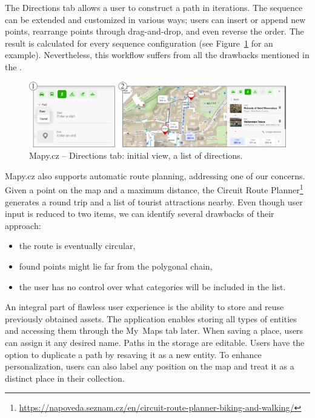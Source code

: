 The Directions tab allows a user to construct a path in iterations. The sequence can be extended and customized in various ways; users can insert or append new points, rearrange points through drag-and-drop, and even reverse the order. The result is calculated for every sequence configuration (see Figure~\ref{fig:analysis-mapy-cz-directions} for an example). Nevertheless, this workflow suffers from all the drawbacks mentioned in the \emph{}.

\begin{figure}[!h]
\centering
\includegraphics[width=\linewidth]{img/analysis/mapy-cz-directions.png}
\caption{Mapy.cz -- Directions tab:  initial view,  a list of directions.}
\label{fig:analysis-mapy-cz-directions}
\end{figure}

Mapy.cz also supports automatic route planning, addressing one of our concerns. Given a point on the map and a maximum distance, the Circuit Route Planner\footnote{\href{https://napoveda.seznam.cz/en/circuit-route-planner-biking-and-walking/}{https://napoveda.seznam.cz/en/circuit-route-planner-biking-and-walking/}} generates a round trip and a list of tourist attractions nearby. Even though user input is reduced to two items, we can identify several drawbacks of their approach:
\begin{itemize}
\item the route is eventually circular,
\item found points might lie far from the polygonal chain,
\item the user has no control over what categories will be included in the list.
\end{itemize}

An integral part of flawless user experience is the ability to store and reuse previously obtained assets. The application enables storing all types of entities and accessing them through the My~Maps tab later. When saving a place, users can assign it any desired name. Paths in the storage are editable. Users have the option to duplicate a path by resaving it as a new entity. To enhance personalization, users can also label any position on the map and treat it as a distinct place in their collection.

